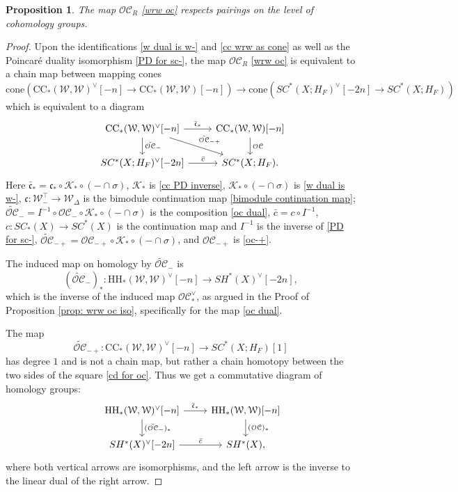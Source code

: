 \documentclass[11pt]{amsproc}
\def\w{\mathcal{W}(E)}
\def\oc{\mathcal{OC}}
\def\r#1{\mathrm{#1}}
\def\w{\mathcal{W}}
\def\D{\Delta}
\def\cone{\mathrm{cone}}
\def\ck{\mathfrak{c}}
\newtheorem{prop}[lem]{Proposition}
\theoremstyle{remark}
\numberwithin{equation}{section}
\begin{document}
\begin{prop}\label{prop: oc intertwines pairing}
The map $\oc_{R}$ \eqref{wrw oc} respects pairings on the level of cohomology groups.
\end{prop}
\begin{proof}
Upon the identifications \eqref{w dual is w-} and \eqref{cc wrw as cone} as well as the Poincar\'{e} duality isomorphism \eqref{PD for sc-}, 
the map $\oc_{R}$ \eqref{wrw oc} is equivalent to a chain map between mapping cones 
\begin{equation}
\cone(\r{CC}_{*}(\w, \w)^{\vee}[-n] \to \r{CC}_{*}(\w, \w)[-n]) \to \cone(SC^{*}(X; H_{F})^{\vee}[-2n] \to SC^{*}(X; H_{F}))
\end{equation}
which is equivalent to a diagram
\begin{equation}\label{cd for oc}
\begin{tikzcd}
& \r{CC}_{*}(\w, \w)^{\vee}[-n] \arrow[r, "\bar{\ck}_{*}"] \arrow[d, "\tilde{\oc}_{-}"] \arrow[rd, "\tilde{\oc}_{-+}"] & \r{CC}_{*}(\w, \w)[-n] \arrow[d, "\oc"] \\
& SC^{*}(X; H_{F})^{\vee}[-2n] \arrow[r, "\bar{c}"] & SC^{*}(X; H_{F}).
\end{tikzcd}
\end{equation}
Here $\bar{\ck}_{*} = \ck_{*} \circ \mathcal{K}_{*} \circ (-\cap \sigma)$, 
 $\mathcal{K}_{*}$ is \eqref{cc PD inverse}, 
 $\mathcal{K}_{*} \circ (-\cap \sigma)$ is \eqref{w dual is w-}, $\ck: \w_{-}^{\top} \to \w_{\D}$ is the bimodule continuation map \eqref{bimodule continuation map};
$\tilde{\oc}_{-} = I^{-1} \circ \oc_{-} \circ \mathcal{K}_{*} \circ (-\cap \sigma)$ is the composition \eqref{oc dual},
 $\bar{c} = c \circ I^{-1}$,
 $c: SC_{*}(X) \to SC^{*}(X)$ is the continuation map and $I^{-1}$ is the inverse of \eqref{PD for sc-},
  $\tilde{\oc}_{-+} = \oc_{-+} \circ \mathcal{K}_{*} \circ (-\cap \sigma)$,
and $\oc_{-+}$ is \eqref{oc-+}.

The induced map on homology by $\tilde{\oc}_{-}$ is 
\begin{equation}
(\tilde{\oc}_{-})_{*}: \r{HH}_{*}(\w, \w)^{\vee}[-n] \to SH^{*}(X)^{\vee}[-2n],
\end{equation}
which is the inverse of the induced map $\oc^{\vee}_{*}$,
as argued in the Proof of Proposition \ref{prop: wrw oc iso},
specifically for the map \eqref{oc dual}.

The map 
\[
\tilde{\oc}_{-+}: \r{CC}_{*}(\w, \w)^{\vee}[-n] \to SC^{*}(X; H_{F})[1]
\]
has degree $1$ and is not a chain map, but rather a chain homotopy between the two sides of the square \eqref{cd for oc}.
Thus we get a commutative diagram of homology groups:
\begin{equation}\label{cd for oc homology}
\begin{tikzcd}
& \r{HH}_{*}(\w, \w)^{\vee}[-n] \arrow[r, "\bar{\ck}_{*}"] \arrow[d, "(\tilde{\oc}_{-})_{*}"]  & \r{HH}_{*}(\w, \w)[-n] \arrow[d, "(\oc)_{*}"] \\
& SH^{*}(X)^{\vee}[-2n] \arrow[r, "\bar{c}"] & SH^{*}(X),
\end{tikzcd}
\end{equation}
where both vertical arrows are isomorphisms,
and the left arrow is the inverse to the linear dual of the right arrow.


\end{proof}
\end{document}
